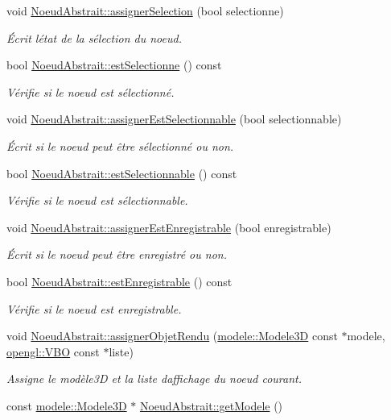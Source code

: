 \begin{DoxyCompactItemize}
void \hyperlink{group__inf2990_ga0f39647390d357d8662a870f0c76242c}{Noeud\+Abstrait\+::assigner\+Selection} (bool selectionne)
\begin{DoxyCompactList}\small\item\em Écrit l\textquotesingle{}état de la sélection du noeud. \end{DoxyCompactList}\item 
bool \hyperlink{group__inf2990_ga8fb7a3313ce4d361ef7ec8e45ba8add5}{Noeud\+Abstrait\+::est\+Selectionne} () const 
\begin{DoxyCompactList}\small\item\em Vérifie si le noeud est sélectionné. \end{DoxyCompactList}\item 
void \hyperlink{group__inf2990_ga397add0bac7ec3b842598a2085990b7d}{Noeud\+Abstrait\+::assigner\+Est\+Selectionnable} (bool selectionnable)
\begin{DoxyCompactList}\small\item\em Écrit si le noeud peut être sélectionné ou non. \end{DoxyCompactList}\item 
bool \hyperlink{group__inf2990_gaa3f3a34571af62de0da5db2d8f54f690}{Noeud\+Abstrait\+::est\+Selectionnable} () const 
\begin{DoxyCompactList}\small\item\em Vérifie si le noeud est sélectionnable. \end{DoxyCompactList}\item 
void \hyperlink{group__inf2990_gabb7f3756a4094dc588690126ec0703d3}{Noeud\+Abstrait\+::assigner\+Est\+Enregistrable} (bool enregistrable)
\begin{DoxyCompactList}\small\item\em Écrit si le noeud peut être enregistré ou non. \end{DoxyCompactList}\item 
bool \hyperlink{group__inf2990_ga6a6af3639f1b4e3e33a126703376dcec}{Noeud\+Abstrait\+::est\+Enregistrable} () const 
\begin{DoxyCompactList}\small\item\em Vérifie si le noeud est enregistrable. \end{DoxyCompactList}\item 
void \hyperlink{group__inf2990_ga1f533acce98fbad7fa82758ccaea55ff}{Noeud\+Abstrait\+::assigner\+Objet\+Rendu} (\hyperlink{classmodele_1_1_modele3_d}{modele\+::\+Modele3\+D} const $\ast$modele, \hyperlink{classopengl_1_1_v_b_o}{opengl\+::\+V\+B\+O} const $\ast$liste)
\begin{DoxyCompactList}\small\item\em Assigne le modèle3\+D et la liste d\textquotesingle{}affichage du noeud courant. \end{DoxyCompactList}\item 
\hypertarget{group__inf2990_gacf20d310cd93a8ba2c3e4bc182398853}{}const \hyperlink{classmodele_1_1_modele3_d}{modele\+::\+Modele3\+D} $\ast$ \hyperlink{group__inf2990_gacf20d310cd93a8ba2c3e4bc182398853}{Noeud\+Abstrait\+::get\+Modele} ()\label{group__inf2990_gacf20d310cd93a8ba2c3e4bc182398853}


\end{DoxyCompactItemize}
